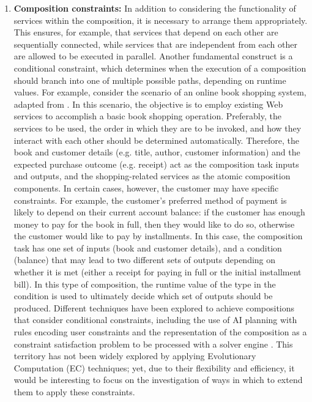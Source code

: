 \begin{enumerate}
 \item \textbf{Composition constraints:} In addition to considering the functionality of services within the composition, it is necessary to arrange them appropriately. This ensures, for example, that services that depend on each other are sequentially connected, while services that are independent from each other are allowed to be executed in parallel. Another fundamental construct is a conditional constraint, which determines when the execution of a composition should branch into one of multiple possible paths, depending on runtime values. For example, consider the scenario of an online book shopping system, adapted from \cite{wang2014automated}. In this scenario, the objective is to employ existing Web services to accomplish a basic book shopping operation. Preferably, the services to be used, the order in which they are to be invoked, and how they interact with each other should be determined automatically. Therefore, the book and customer details (e.g. title, author, customer information) and the expected purchase outcome (e.g. receipt) act as the composition task inputs and outputs, and the shopping-related services as the atomic composition components. In certain cases, however, the customer may have specific constraints. For example, the customer's preferred method of payment is likely to depend on their current account balance: if the customer has enough money to pay for the book in full, then they would like to do so, otherwise the customer would like to pay by installments. In this case, the composition task has one set of inputs (book and customer details), and a condition (balance) that may lead to two different sets of outputs depending on whether it is met (either a receipt for paying in full or the initial installment bill). In this type of composition, the runtime value of the type in the condition is used to ultimately decide which set of outputs should be produced. Different techniques have been explored to achieve compositions that consider conditional constraints, including the use of AI planning with rules encoding user constraints \cite{DBLP:journals/soca/BoustilMS14} and the representation of the composition as a constraint satisfaction problem to be processed with a solver engine \cite{karakoc2009composing}. This territory has not been widely explored by applying Evolutionary Computation (EC) techniques; yet, due to their flexibility and efficiency, it would be interesting to focus on the investigation of ways in which to extend them to apply these constraints.
 

\end{enumerate}
